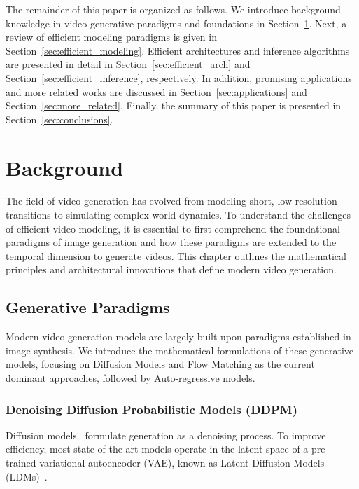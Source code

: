 \documentclass[lettersize,journal]{IEEEtran}
\begin{document}
The remainder of this paper is organized as follows. We introduce background knowledge in video generative paradigms and foundations in Section~\ref{sec:background}. Next, a review of efficient modeling paradigms is given in Section~\ref{sec:efficient_modeling}. Efficient architectures and inference algorithms are presented in detail in Section~\ref{sec:efficient_arch} and Section~\ref{sec:efficient_inference}, respectively. In addition, promising applications and more related works are discussed in Section~\ref{sec:applications} and Section~\ref{sec:more_related}. Finally, the summary of this paper is presented in Section~\ref{sec:conclusions}.





\section{Background}
\label{sec:background}
The field of video generation has evolved from modeling short, low-resolution transitions to simulating complex world dynamics. To understand the challenges of efficient video modeling, it is essential to first comprehend the foundational paradigms of image generation and how these paradigms are extended to the temporal dimension to generate videos. This chapter outlines the mathematical principles and architectural innovations that define modern video generation.

\subsection{Generative Paradigms}
Modern video generation models are largely built upon paradigms established in image synthesis. We introduce the mathematical formulations of these generative models, focusing on Diffusion Models and Flow Matching as the current dominant approaches, followed by Auto-regressive models.

\subsubsection{Denoising Diffusion Probabilistic Models (DDPM)}
Diffusion models~\cite{ho2020denoising} formulate generation as a denoising process. To improve efficiency, most state-of-the-art models operate in the latent space of a pre-trained variational autoencoder (VAE), known as Latent Diffusion Models (LDMs)~\cite{rombach2022high}.
\end{document}
